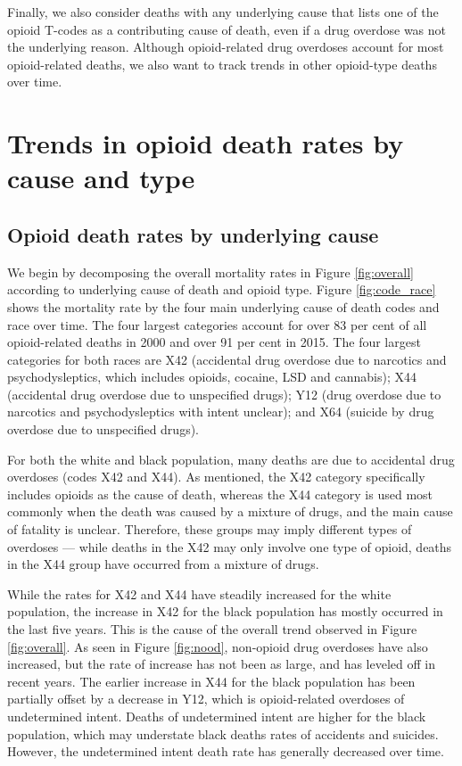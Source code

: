 \documentclass[12pt, a4paper]{article}
\begin{document}
Finally, we also consider deaths with any underlying cause that lists one of the opioid T-codes as a contributing cause of death, even if a drug overdose was not the underlying reason. Although opioid-related drug overdoses account for most opioid-related deaths, we also want to track trends in other opioid-type deaths over time. 



\section{Trends in opioid death rates by cause and type} \label{section:overall}
\subsection{Opioid death rates by underlying cause}
We begin by decomposing the overall mortality rates in Figure \ref{fig:overall} according to underlying cause of death and opioid type. Figure \ref{fig:code_race} shows the mortality rate by the four main underlying cause of death codes and race over time. The four largest categories account for over 83 per cent of all opioid-related deaths in 2000 and over 91 per cent in 2015. The four largest categories for both races are X42 (accidental drug overdose due to narcotics and psychodysleptics, which includes opioids, cocaine, LSD and cannabis); X44 (accidental drug overdose due to unspecified drugs); Y12 (drug overdose due to narcotics and psychodysleptics with intent unclear); and X64 (suicide by drug overdose due to unspecified drugs). 

For both the white and black population, many deaths are due to accidental drug overdoses (codes X42 and X44). As mentioned, the X42 category specifically includes opioids as the cause of death, whereas the X44 category is used most commonly when the death was caused by a mixture of drugs, and the main cause of fatality is unclear. Therefore, these groups may imply different types of overdoses --- while deaths in the X42 may only involve one type of opioid, deaths in the X44 group have occurred from a mixture of drugs. 

While the rates for X42 and X44 have steadily increased for the white population, the increase in X42 for the black population has mostly occurred in the last five years. This is the cause of the overall trend observed in Figure \ref{fig:overall}. As seen in Figure \ref{fig:nood}, non-opioid drug overdoses have also increased, but the rate of increase has not been as large, and has leveled off in recent years. The earlier increase in X44 for the black population has been partially offset by a decrease in Y12, which is opioid-related overdoses of undetermined intent. Deaths of undetermined intent are higher for the black population, which may understate black deaths rates of accidents and suicides. However, the undetermined intent death rate has generally decreased over time.
\end{document}
